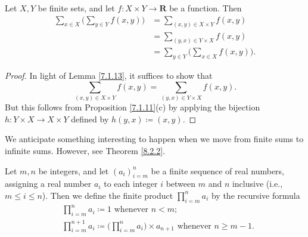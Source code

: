 \begin{corollary}\label{7.1.14}
    Let \(X, Y\) be finite sets, and let \(f : X \times Y \to \mathbf{R}\) be a function.
    Then
    \begin{align*}
        \sum_{x \in X} \bigg(\sum_{y \in Y} f(x, y)\bigg) & = \sum_{(x, y) \in X \times Y} f(x, y)               \\
                                                          & = \sum_{(y, x) \in Y \times X} f(x, y)               \\
                                                          & = \sum_{y \in Y} \bigg(\sum_{x \in X} f(x, y)\bigg).
    \end{align*}
\end{corollary}

\begin{proof}
    In light of Lemma \ref{7.1.13}, it suffices to show that
    \[
        \sum_{(x, y) \in X \times Y} f(x, y) = \sum_{(y, x) \in Y \times X} f(x, y).
    \]
    But this follows from Proposition \ref{7.1.11}(c) by applying the bijection \(h : Y \times X \to X \times Y\) defined by \(h(y, x) \coloneqq (x, y)\).
\end{proof}

\begin{remark}\label{7.1.15}
    We anticipate something interesting to happen when we move from finite sums to infinite sums.
    However, see Theorem \ref{8.2.2}.
\end{remark}

\begin{additional corollary}\label{ac 7.1.1}
Let \(m, n\) be integers, and let \((a_i)_{i = m}^n\) be a finite sequence of real numbers, assigning a real number \(a_i\) to each integer \(i\) between \(m\) and \(n\) inclusive (i.e., \(m \leq i \leq n\)).
Then we define the finite product \(\prod_{i = m}^n a_i\) by the recursive formula
\begin{align*}
     & \prod_{i = m}^n a_i \coloneqq 1 \text{ whenever } n < m;                                                             \\
     & \prod_{i = m}^{n + 1} a_i \coloneqq \Bigg(\prod_{i = m}^n a_i\Bigg) \times a_{n + 1} \text{ whenever } n \geq m - 1.
\end{align*}
\end{additional corollary}

